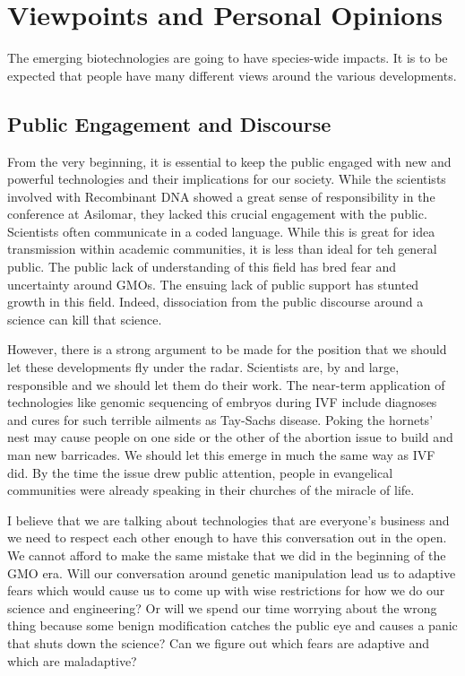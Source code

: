 \section{Viewpoints and Personal Opinions}
\label{sec:viewpoints}

The emerging biotechnologies are going to have species-wide impacts.
It is to be expected that people have many different views around the various developments.

\subsection{Public Engagement and Discourse}

From the very beginning, it is essential to keep the public engaged with new and powerful technologies and their implications for our society.
While the scientists involved with Recombinant DNA showed a great sense of responsibility in the conference at Asilomar, they lacked this crucial engagement with the public.
Scientists often communicate in a coded language.
While this is great for idea transmission within academic communities, it is less than ideal for teh general public.
The public lack of understanding of this field has bred fear and uncertainty around GMOs.
The ensuing lack of public support has stunted growth in this field.
Indeed, dissociation from the public discourse around a science can kill that science.

However, there is a strong argument to be made for the position that we should let these developments fly under the radar.
Scientists are, by and large, responsible and we should let them do their work.
The near-term application of technologies like genomic sequencing of embryos during IVF include diagnoses and cures for such terrible ailments as Tay-Sachs disease.
Poking the hornets' nest may cause people on one side or the other of the abortion issue to build and man new barricades.
We should let this emerge in much the same way as IVF did.
By the time the issue drew public attention, people in evangelical communities were already speaking in their churches of the miracle of life.

I believe that we are talking about technologies that are everyone's business and we need to respect each other enough to have this conversation out in the open.
We cannot afford to make the same mistake that we did in the beginning of the GMO era.
Will our conversation around genetic manipulation lead us to adaptive fears which would cause us to come up with wise restrictions for how we do our science and engineering?
Or will we spend our time worrying about the wrong thing because some benign modification catches the public eye and causes a panic that shuts down the science?
Can we figure out which fears are adaptive and which are maladaptive?

